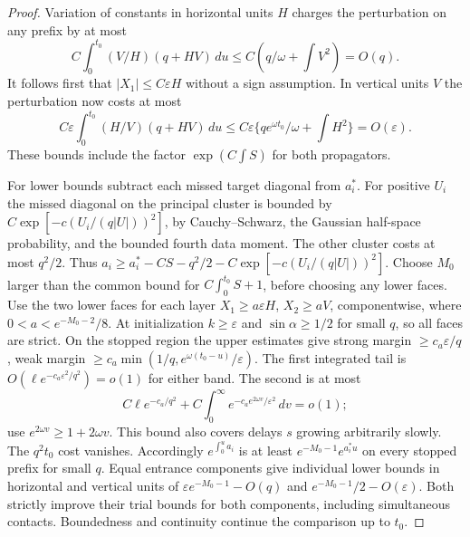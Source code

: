 \documentclass[11pt]{article}
\newcommand{\eps}{\varepsilon}
\begin{document}
\begin{proof}
Variation of constants in horizontal units $H$ charges the perturbation on any prefix by at most
\[
 C\int_0^{t_0}(V/H)(q+HV)\,du\le C(q/\omega+\int V^2)=O(q).
\]
It follows first that $|X_1|\le C\eps H$ without a sign assumption. In vertical units $V$ the perturbation now costs at most
\[
 C\eps\int_0^{t_0}(H/V)(q+HV)\,du
 \le C\eps\{q e^{\omega t_0}/\omega+\int H^2\}=O(\eps).
\]
These bounds include the factor $\exp(C\int S)$ for both propagators.

For lower bounds subtract each missed target diagonal from $a_i^*$. For positive $U_i$ the missed diagonal on the principal cluster is bounded by $C\exp[-c(U_i/(q|U|))^2]$, by Cauchy--Schwarz, the Gaussian half-space probability, and the bounded fourth data moment. The other cluster costs at most $q^2/2$. Thus
$a_i\ge a_i^*-CS-q^2/2-C\exp[-c(U_i/(q|U|))^2]$.
Choose $M_0$ larger than the common bound for $C\int_0^{t_0}S+1$, before choosing any lower faces. Use the two lower faces for each layer $X_1\ge a\eps H$, $X_2\ge a V$, componentwise, where $0<a<e^{-M_0-2}/8$. At initialization $k\ge\eps$ and $\sin\alpha\ge1/2$ for small $q$, so all faces are strict. On the stopped region the upper estimates give strong margin $\ge c_a\eps/q$, weak margin
$\ge c_a\min(1/q,e^{\omega(t_0-u)}/\eps)$. The first integrated tail is $O(\ell e^{-c_a\eps^2/q^2})=o(1)$ for either band. The second is at most
\[
 C\ell e^{-c_a/q^2}
 +C\int_0^\infty e^{-c_a e^{2\omega v}/\eps^2}\,dv=o(1);
\]
use $e^{2\omega v}\ge1+2\omega v$. This bound also covers delays $s$ growing arbitrarily slowly. The $q^2t_0$ cost vanishes. Accordingly $e^{\int_0^u a_i}$ is at least $e^{-M_0-1}e^{a_i^*u}$ on every stopped prefix for small $q$. Equal entrance components give individual lower bounds in horizontal and vertical units of $\eps e^{-M_0-1}-O(q)$ and $e^{-M_0-1}/2-O(\eps)$. Both strictly improve their trial bounds for both components, including simultaneous contacts. Boundedness and continuity continue the comparison up to $t_0$.


\end{proof}
\end{document}

